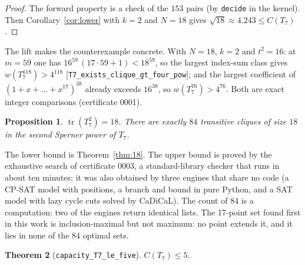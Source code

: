 \documentclass[11pt]{article}
\newtheorem{theorem}{Theorem}
\newtheorem{proposition}[theorem]{Proposition}
\theoremstyle{definition}
\theoremstyle{remark}
\newcommand{\tr}{\operatorname{tr}}
\begin{document}
\begin{proof}
The forward property is a check of the $153$ pairs (by \texttt{decide} in the kernel). Then
Corollary~\ref{cor:lower} with $k = 2$ and $N = 18$ gives $\sqrt{18} \approx 4.243 \le C(T_7)$.
\end{proof}

The lift makes the counterexample concrete. With $N = 18$, $k = 2$ and $t^2 = 16$: at $m = 59$ one
has $16^{59} \, (17 \cdot 59 + 1) < 18^{59}$, so the largest index-sum class gives
$w(T_7^{118}) > 4^{118}$ [\texttt{T7\_exists\_clique\_gt\_four\_pow}]; and the largest coefficient
of $(1 + x + \dots + x^{17})^{38}$ already exceeds $16^{38}$, so $w(T_7^{76}) > 4^{76}$. Both are
exact integer comparisons (certificate 0001).

\begin{proposition}\label{prop:exact}
$\tr(T_7^2) = 18$. There are exactly $84$ transitive cliques of size $18$ in the second Sperner
power of $T_7$.
\end{proposition}

The lower bound is Theorem~\ref{thm:18}. The upper bound is proved by the exhaustive search of
certificate 0003, a standard-library checker that runs in about ten minutes; it was also obtained by
three engines that share no code (a CP-SAT model with positions, a branch and bound in pure Python,
and a SAT model with lazy cycle cuts solved by CaDiCaL). The count of 84 is a computation: two of the
engines return identical lists. The 17-point set found first in this
work is inclusion-maximal but not maximum: no point extends it, and it lies in none of the 84
optimal sets.

\begin{theorem}[\texttt{capacity\_T7\_le\_five}]\label{thm:ub}
$C(T_7) \le 5$.
\end{theorem}
\end{document}

